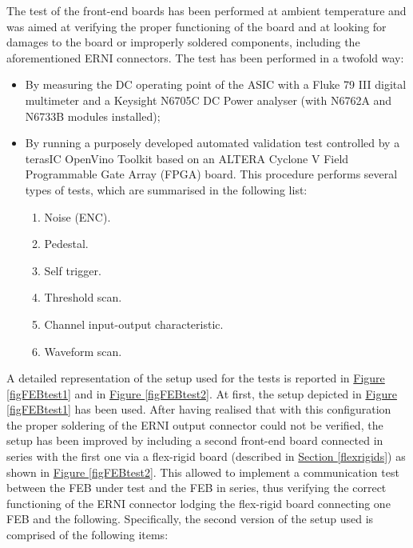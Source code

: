 \par

\par
The test of the front-end boards has been performed at ambient temperature and was aimed at verifying the proper functioning of the board and at looking for damages to the board or improperly soldered components, including the aforementioned ERNI connectors. The test has been performed in a twofold way:

\begin{itemize}
    \itemsep0em 
    \item By measuring the DC operating point of the ASIC with a Fluke 79 III digital multimeter and a Keysight N6705C DC Power analyser (with N6762A and N6733B modules installed);
    \item By running a purposely developed automated validation test controlled by a terasIC OpenVino Toolkit based on an ALTERA Cyclone V Field Programmable Gate Array (FPGA) board. This procedure performs several types of tests, which are summarised in the following list:
    
    \begin{enumerate}
        \bfseries
        \itemsep0em 
        \item Noise (ENC).
        \item Pedestal.
        \item Self trigger.
        \item Threshold scan.
        \item Channel input-output characteristic.
        \item Waveform scan.
    \end{enumerate}
\end{itemize}

\par
A detailed representation of the setup used for the tests is reported in \hyperref[figFEBtest1]{Figure \ref{figFEBtest1}} and in \hyperref[figFEBtest2]{Figure \ref{figFEBtest2}}. At first, the setup depicted in \hyperref[figFEBtest1]{Figure \ref{figFEBtest1}} has been used. After having realised that with this configuration the proper soldering of the ERNI output connector could not be verified, the setup has been improved by including a second front-end board connected in series with the first one via a flex-rigid board (described in \hyperref[flexrigids]{Section \ref{flexrigids}}) as shown in \hyperref[figFEBtest2]{Figure \ref{figFEBtest2}}. This allowed to implement a communication test between the FEB under test and the FEB in series, thus verifying the correct functioning of the ERNI connector lodging the flex-rigid board connecting one FEB and the following. Specifically, the second version of the setup used is comprised of the following items:

